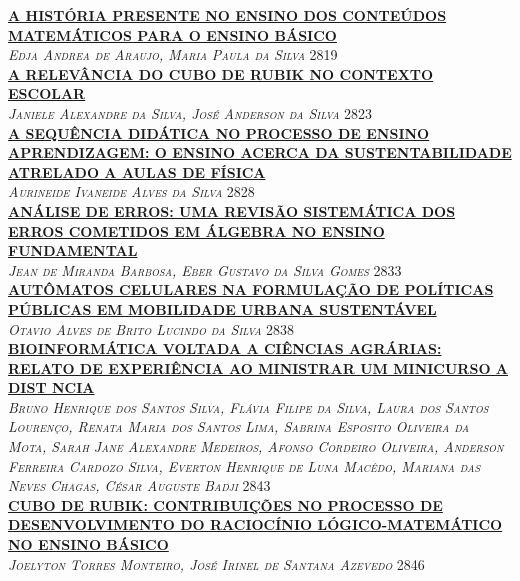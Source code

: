 \noindent \textsc{\hyperlink{trabalhos/250332.pdf.1}{\textbf{A HISTÓRIA PRESENTE NO ENSINO DOS CONTEÚDOS MATEMÁTICOS PARA O ENSINO BÁSICO}}}\\ 
\noindent \textsc{\textit{Edja Andrea de Araujo, Maria Paula da Silva}} \hfill 2819\\ 

\noindent \textsc{\hyperlink{trabalhos/251854.pdf.1}{\textbf{A RELEVÂNCIA DO CUBO DE RUBIK NO CONTEXTO ESCOLAR}}}\\ 
\noindent \textsc{\textit{Janiele Alexandre da Silva, José Anderson da Silva}} \hfill 2823\\ 

\noindent \textsc{\hyperlink{trabalhos/251828.pdf.1}{\textbf{A SEQUÊNCIA DIDÁTICA NO PROCESSO DE ENSINO APRENDIZAGEM: O ENSINO ACERCA DA SUSTENTABILIDADE ATRELADO A AULAS DE FÍSICA }}}\\ 
\noindent \textsc{\textit{Aurineide Ivaneide Alves da Silva}} \hfill 2828\\ 

\noindent \textsc{\hyperlink{trabalhos/249586.pdf.1}{\textbf{ANÁLISE DE ERROS:  UMA REVISÃO SISTEMÁTICA DOS ERROS COMETIDOS EM ÁLGEBRA NO ENSINO FUNDAMENTAL}}}\\ 
\noindent \textsc{\textit{Jean de Miranda Barbosa, Eber Gustavo da Silva Gomes}} \hfill 2833\\ 

\noindent \textsc{\hyperlink{trabalhos/249085.pdf.1}{\textbf{AUTÔMATOS CELULARES NA FORMULAÇÃO DE POLÍTICAS PÚBLICAS EM MOBILIDADE URBANA SUSTENTÁVEL}}}\\ 
\noindent \textsc{\textit{Otavio Alves de Brito Lucindo da Silva}} \hfill 2838\\ 

\noindent \textsc{\hyperlink{trabalhos/250243.pdf.1}{\textbf{BIOINFORMÁTICA VOLTADA A CIÊNCIAS AGRÁRIAS: RELATO DE EXPERIÊNCIA AO MINISTRAR UM MINICURSO A DIST NCIA }}}\\ 
\noindent \textsc{\textit{Bruno Henrique dos Santos Silva, Flávia Filipe da Silva, Laura dos Santos Lourenço, Renata Maria dos Santos Lima, Sabrina Esposito Oliveira da Mota, Sarah Jane Alexandre Medeiros, Afonso Cordeiro Oliveira, Anderson Ferreira Cardozo Silva, Everton Henrique de Luna Macêdo, Mariana das Neves Chagas, César Auguste Badji}} \hfill 2843\\ 

\noindent \textsc{\hyperlink{trabalhos/247022.pdf.1}{\textbf{CUBO DE RUBIK: CONTRIBUIÇÕES NO PROCESSO DE DESENVOLVIMENTO DO RACIOCÍNIO LÓGICO-MATEMÁTICO NO ENSINO BÁSICO}}}\\ 
\noindent \textsc{\textit{Joelyton Torres Monteiro, José Irinel de Santana Azevedo}} \hfill 2846\\ 

